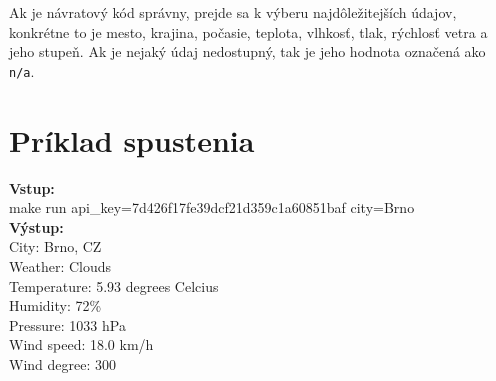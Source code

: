 \documentclass[11pt, a4paper]{article}
\begin{document}
Ak je návratový kód správny, prejde sa k výberu najdôležitejších údajov, konkrétne to je mesto, krajina, počasie, teplota, vlhkosť, tlak, rýchlosť vetra a jeho stupeň. Ak je nejaký údaj nedostupný, tak je jeho hodnota označená ako \texttt{n/a}.

\section{Príklad spustenia}
\textbf{Vstup:}\\
make run api\_key=7d426f17fe39dcf21d359c1a60851baf city=Brno\\

\noindent
\textbf{Výstup:}\\
City: Brno, CZ\\
Weather: Clouds\\
Temperature: 5.93 degrees Celcius\\
Humidity: 72\%\\
Pressure: 1033 hPa\\
Wind speed: 18.0 km/h\\
Wind degree: 300\\
\end{document}
